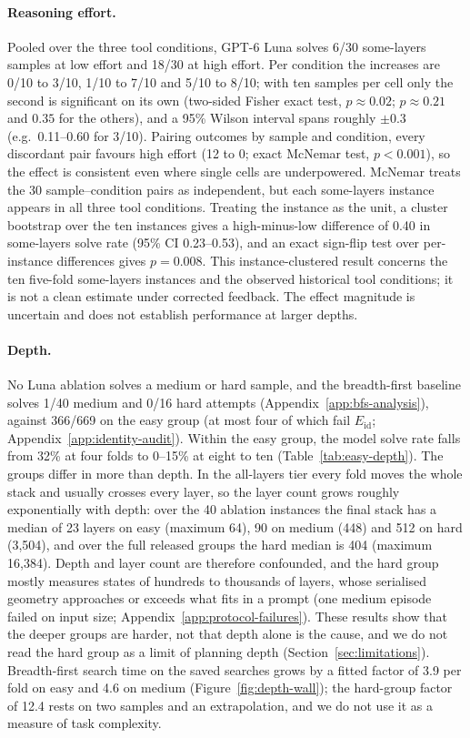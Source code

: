 \paragraph{Reasoning effort.} Pooled over the three tool conditions, GPT-6 Luna solves 6/30
some-layers samples at low effort and 18/30 at high effort. Per condition the increases are
0/10 to 3/10, 1/10 to 7/10 and 5/10 to 8/10; with ten samples per cell only the second is
significant on its own (two-sided Fisher exact test, $p\approx0.02$; $p\approx0.21$ and $0.35$
for the others), and a 95\% Wilson interval spans roughly $\pm0.3$ (e.g.\ 0.11--0.60 for
3/10). Pairing outcomes by sample and condition, every discordant pair favours high effort
(12 to 0; exact McNemar test, $p<0.001$), so the effect is consistent even where single cells
are underpowered. McNemar treats the 30 sample--condition pairs as independent, but each
some-layers instance appears in all three tool conditions. Treating the instance as the unit,
a cluster bootstrap over the ten instances gives a high-minus-low difference of
0.40 in some-layers solve rate (95\% CI 0.23--0.53), and an exact sign-flip test over
per-instance differences gives $p=0.008$. This instance-clustered result concerns the ten five-fold some-layers instances and the
observed historical tool conditions; it is not a clean estimate under corrected feedback.
The effect magnitude is uncertain and does not establish performance at larger depths.

\paragraph{Depth.} No Luna ablation solves a medium or hard sample, and the breadth-first
baseline solves 1/40 medium and 0/16 hard attempts (Appendix~\ref{app:bfs-analysis}), against
366/669 on the easy group (at most four of which fail $E_{\mathrm{id}}$; Appendix~\ref{app:identity-audit}). Within the easy group, the model solve rate falls from 32\% at four folds to
0--15\% at eight to ten (Table~\ref{tab:easy-depth}). The groups differ in more than depth. In
the all-layers tier every fold moves the whole stack and usually crosses every layer, so the
layer count grows roughly exponentially with depth: over the 40 ablation instances the final
stack has a median of 23 layers on easy (maximum 64), 90 on medium (448) and 512 on hard (3,504),
and over the full released groups the hard median is 404 (maximum 16,384). Depth and layer count
are therefore confounded, and the hard group mostly measures states of hundreds to thousands of
layers, whose serialised geometry approaches or exceeds what fits in a prompt (one medium
episode failed on input size; Appendix~\ref{app:protocol-failures}). These results show that the
deeper groups are harder, not that depth alone is the cause, and we do not read the hard group as
a limit of planning depth (Section~\ref{sec:limitations}).
Breadth-first search time on the saved searches grows by a fitted factor of 3.9 per fold on easy
and 4.6 on medium (Figure~\ref{fig:depth-wall}); the hard-group factor of 12.4 rests on two samples
and an extrapolation, and we do not use it as a measure of task complexity.

